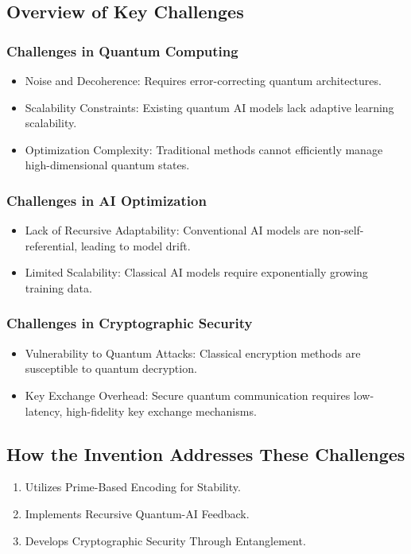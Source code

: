 \documentclass{article}
\theoremstyle{plain}
\begin{document}
\begin{itemize}
\subsection{Overview of Key Challenges}
\subsubsection{Challenges in Quantum Computing}
\begin{itemize}
    \item Noise and Decoherence: Requires error-correcting quantum architectures.
    \item Scalability Constraints: Existing quantum AI models lack adaptive learning scalability.
    \item Optimization Complexity: Traditional methods cannot efficiently manage high-dimensional quantum states.
\end{itemize}

\subsubsection{Challenges in AI Optimization}
\begin{itemize}
    \item Lack of Recursive Adaptability: Conventional AI models are non-self-referential, leading to model drift.
    \item Limited Scalability: Classical AI models require exponentially growing training data.
\end{itemize}

\subsubsection{Challenges in Cryptographic Security}
\begin{itemize}
    \item Vulnerability to Quantum Attacks: Classical encryption methods are susceptible to quantum decryption.
    \item Key Exchange Overhead: Secure quantum communication requires low-latency, high-fidelity key exchange mechanisms.
\end{itemize}

\subsection{How the Invention Addresses These Challenges}
\begin{enumerate}
    \item Utilizes Prime-Based Encoding for Stability.
    \item Implements Recursive Quantum-AI Feedback.
    \item Develops Cryptographic Security Through Entanglement.
\end{enumerate}


\end{itemize}
\end{document}
